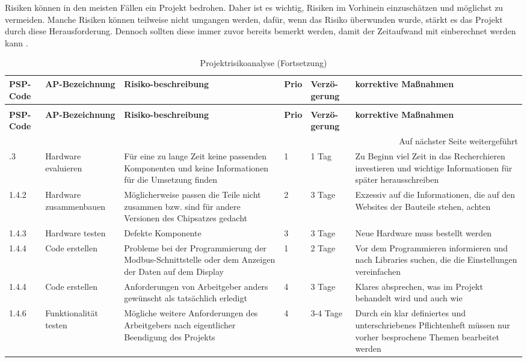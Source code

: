 Risiken können in den meisten Fällen ein Projekt bedrohen. Daher ist es wichtig, Risiken im Vorhinein einzuschätzen und möglichst zu vermeiden. Manche Risiken können teilweise nicht umgangen werden, dafür, wenn das Risiko überwunden wurde, stärkt es das Projekt durch diese Herausforderung. Dennoch sollten diese immer zuvor bereits bemerkt werden, damit der Zeitaufwand mit einberechnet werden kann \cite{timetrackapp:2021}.

\begin{longtable}{p{} | p{} | p{} | p{} | p{} | p{}}
	\caption{Projektrisikoanalyse}
	\label{tab:risikoanalyse}
	\\ \toprule
	\textbf{PSP-Code} & \textbf{AP-Bezeichnung} & \textbf{Risiko-beschreibung} & \textbf{Prio} & \textbf{Verzö-gerung} & \textbf{korrektive Maßnahmen}
	\\ \midrule
	\endfirsthead
	\caption{Projektrisikoanalyse (Fortsetzung)}
	\\ \toprule
		\textbf{PSP-Code} & \textbf{AP-Bezeichnung} & \textbf{Risiko-beschreibung} & \textbf{Prio} & \textbf{Verzö-gerung} & \textbf{korrektive Maßnahmen}
	\\ \midrule
	\endhead
	\midrule
	\multicolumn{6}{r}{{Auf nächster Seite weitergeführt}} 
	\\ \bottomrule
	\endfoot
	\bottomrule
	\endlastfoot
	1.3.3 & Hardware evaluieren &  Für eine zu lange Zeit keine passenden Komponenten und keine Informationen für die Umsetzung finden & 1 & 1 Tag & Zu Beginn viel Zeit in das Recherchieren investieren und wichtige Informationen für später herausschreiben \\ \midrule
	1.4.2 & Hardware zusammenbauen & Möglicherweise passen die Teile nicht zusammen bzw. sind für andere Versionen des Chipsatzes gedacht & 2 & 3 Tage & Exzessiv auf die Informationen, die auf den Websites der Bauteile stehen, achten  \\ \midrule
	1.4.3 & Hardware testen & Defekte Komponente & 3 & 3 Tage & Neue Hardware muss bestellt werden \\ 
	1.4.4 & Code erstellen & Probleme bei der Programmierung der Modbus-Schnittstelle oder dem Anzeigen der Daten auf dem Display & 1 & 2 Tage & Vor dem Programmieren informieren und nach Libraries suchen, die die Einstellungen vereinfachen \\ \midrule
	1.4.4 & Code erstellen & Anforderungen von Arbeitgeber anders gewünscht als tatsächlich erledigt & 4 & 3 Tage & Klares absprechen, was im Projekt behandelt wird und auch wie \\ \midrule
	1.4.6 & Funktionalität testen & Mögliche weitere Anforderungen des Arbeitgebers nach eigentlicher Beendigung des Projekts  & 4 & 3-4 Tage & Durch ein klar definiertes und unterschriebenes Pflichtenheft müssen nur vorher besprochene Themen bearbeitet werden \\
\end{longtable}
